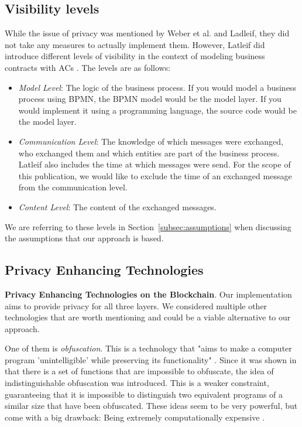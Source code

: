 \documentclass[runningheads]{llncs}
\newcommand{\ber}[1]{\textit{#1}}
\newcommand{\refsec}[1]{Section~\ref{#1}}
\begin{document}
\subsection{Visibility levels} \label{subsec:levels}

While the issue of privacy was mentioned by Weber et al. and Ladleif, they did not take any measures to actually implement them. However, Latleif did introduce different levels of visibility in the context of modeling business contracts with ACs \cite{ladleif}. The levels are as follows:



\begin{itemize}
    \item \ber{Model Level}: The logic of the business process. If you would model a business process using BPMN, the BPMN model would be the model layer. If you would implement it using a programming language, the source code would be the model layer.
    \item \ber{Communication Level}: The knowledge of which messages were exchanged, who exchanged them and which entities are part of the business process. Latleif also includes the time at which messages were send. For the scope of this publication, we would like to exclude the time of an exchanged message from the communication level.
    \item \ber{Content Level}: The content of the exchanged messages.
\end{itemize}

We are referring to these levels in \refsec{subsec:assumptions} when discussing the assumptions that our approach is based.






\subsection{Privacy Enhancing Technologies} \label{subsec:technologies}

\textbf{Privacy Enhancing Technologies on the Blockchain}. Our implementation aims to provide privacy for all three layers. We considered multiple other technologies that are  worth mentioning and could be a viable alternative to our approach. 

One of them is \textit{obfuscation}. This is a technology that "aims to make a computer program 'unintelligible' while preserving its functionality" \cite{garg2016candidate}. Since it was shown in \cite{barak2001possibility,barak2012possibility} that there is a set of functions that are impossible to obfuscate, the idea of indistinguishable obfuscation  was introduced. This is a weaker constraint, guaranteeing that it is impossible to distinguish two equivalent programs of a similar size that have been obfuscated. These ideas seem to be very powerful, but come with a big drawback: Being extremely computationally expensive \cite{banescu2015idea}. 
\end{document}
